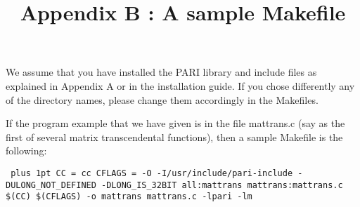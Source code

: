 \title{Appendix B : A sample Makefile}

We assume that you have installed the PARI library and include files
as explained in Appendix A or in the installation guide. If you chose
differently any of the directory names, please change them accordingly
in the Makefiles.

If the program example that we have given is in the file mattrans.c
(say as the first of several matrix transcendental functions), then
a sample Makefile is the following:

{\tt \obeylines\parskip=0pt plus 1pt
\hbox{}
CC = cc
CFLAGS = -O -I/usr/include/pari-include -DULONG\_NOT\_DEFINED -DLONG\_IS\_32BIT
\hbox{}
all:\qquad mattrans
\hbox{}
mattrans:\qquad	mattrans.c
\qquad	\$(CC) \$(CFLAGS) -o mattrans mattrans.c -lpari -lm
}

\vfill\eject










